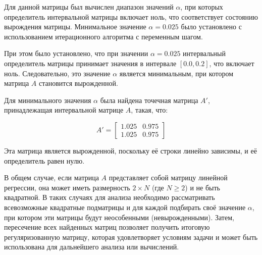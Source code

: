 \documentclass{article}
\begin{document}
  Для данной матрицы был вычислен диапазон значений \(\alpha\), при которых
  определитель интервальной матрицы включает ноль, что соответствует
  состоянию вырождения матрицы. Минимальное значение \(\alpha = 0.025\)
  было установлено с использованием итерационного алгоритма с переменным
  шагом.

  При этом было установлено, что при значении \( \alpha = 0.025 \)
  интервальный определитель матрицы принимает значения в интервале
  \( [0.0, 0.2] \), что включает ноль. Следовательно, это значение
  \( \alpha \) является минимальным, при котором матрица \( A \) становится
  вырожденной.

  Для минимального значения \( \alpha \) была найдена точечная матрица
  \(A'\), принадлежащая интервальной матрице \( A \), такая, что:

  \[
    A' = \begin{bmatrix}
      1.025 & 0.975 \\
      1.025 & 0.975
    \end{bmatrix}
  \]

  Эта матрица является вырожденной, поскольку её строки линейно зависимы,
  и её определитель равен нулю.

  В общем случае, если матрица \( A \) представляет собой матрицу линейной
  регрессии, она может иметь размерность \(2 \times N\) (где \(N \geq 2\)) и
  не быть квадратной. В таких случаях для анализа необходимо рассматривать
  всевозможные квадратные подматрицы и для каждой подбирать своё значение
  \( \alpha \), при котором эти матрицы будут неособенными
  (невырожденными). Затем, пересечение всех найденных матриц позволяет
  получить итоговую регуляризованную матрицу, которая удовлетворяет
  условиям задачи и может быть использована для дальнейшего анализа или
  вычислений.
\end{document}
